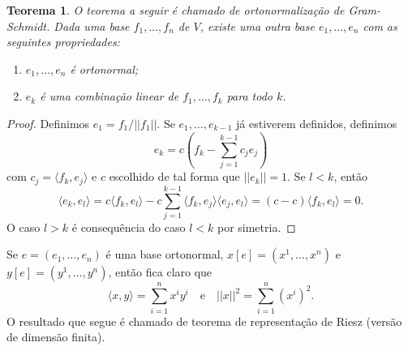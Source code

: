 \documentclass{article}
\newtheorem{theorem}[definition]{Teorema}
\begin{document}
\begin{theorem}
    O teorema a seguir é chamado de ortonormalização de Gram-Schmidt. Dada uma base $f_1, \dots, f_n$ de $V$, existe uma outra base $e_1, \dots, e_n$ com as seguintes propriedades: \begin{enumerate}
        \item $e_1, \dots, e_n$ é ortonormal;
        \item $e_k$ é uma combinação linear de $f_1, \dots, f_k$ para todo $k$.
    \end{enumerate}
\end{theorem}
\begin{proof}
    Definimos $e_1 = f_1/||f_1||$. Se $e_1, \dots, e_{k-1}$ já estiverem definidos, definimos \begin{equation}
        e_k = c\left(f_k - \sum_{j = 1}^{k-1} c_j e_j\right)
    \end{equation} com $c_j = \langle f_k, e_j \rangle$ e $c$ escolhido de tal forma que $||e_k|| = 1$. Se $l < k$, então \begin{equation}
        \langle e_k, e_l \rangle = c\langle f_k, e_l \rangle - c\sum_{j = 1}^{k - 1} \langle f_k, e_j \rangle \langle e_j, e_l \rangle = (c - c)\langle f_k, e_l \rangle = 0.
    \end{equation} O caso $l > k$ é consequência do caso $l < k$ por simetria.
\end{proof}

Se $e = (e_1, \dots, e_n)$ é uma base ortonormal, $x[e] = (x^1, \dots, x^n)$ e $y[e] = (y^1, \dots, y^n)$, então fica claro que \begin{equation}
    \langle x, y \rangle = \sum_{i = 1}^n x^i y^i \quad \text{e} \quad ||x||^2 = \sum_{i = 1}^n (x^i)^2.
\end{equation} O resultado que segue é chamado de teorema de representação de Riesz (versão de dimensão finita).
\end{document}
